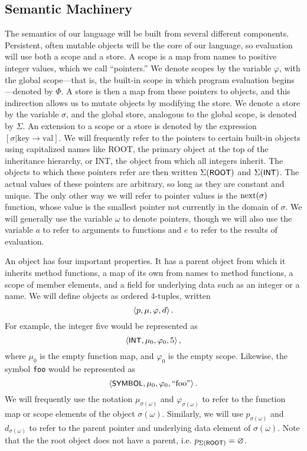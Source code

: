 \documentclass[twocolumn]{article}
\begin{document}
\subsection*{Semantic Machinery}
The semantics of our language will be built from several different
components. Persistent, often mutable objects will be the core of our
language, so evaluation will use both a scope and a store. A scope is
a map from names to positive integer values, which we call
``pointers.'' We denote scopes by the variable $\varphi$, with the
global scope---that is, the built-in scope in which program evaluation
begins---denoted by $\Phi$. A store is then a map from these pointers
to objects, and this indirection allows us to mutate objects by
modifying the store. We denote a store by the variable $\sigma$, and
the global store, analogous to the global scope, is denoted by
$\Sigma$. An extension to a scope or a store is denoted by the
expression $[\sigma|\text{key}\rightarrow\text{val}]$. We will
frequently refer to the pointers to certain built-in objects using
capitalized names like {\ptr ROOT}, the primary object at the top of
the inheritance hierarchy, or {\ptr INT}, the object from which all
integers inherit. The objects to which these pointers refer are then
written $\Sigma(\text{\sf \small ROOT})$ and $\Sigma(\text{\sf \small INT})$. The actual
values of these pointers are arbitrary, so long as they are constant
and unique. The only other way we will refer to pointer values is the
$\operatorname{next}(\sigma)$ function, whose value is the smallest pointer not
currently in the domain of $\sigma$. We will generally use the
variable $\omega$ to denote pointers, though we will also use the
variable $a$ to refer to arguments to functions and $e$ to refer to
the results of evaluation.

An object has four important properties. It has a parent object from
which it inherits method functions, a map of its own from names to
method functions, a scope of member elements, and a field for
underlying data such as an integer or a name. We will define objects
as ordered 4-tuples, written
\[ \left< p, \mu, \varphi, d \right> .\]
For example, the integer five would be represented as
\[ \left< \text{\sf \small INT}, \mu_0, \varphi_0, 5 \right>, \]
where $\mu_0$ is the empty function map, and $\varphi_0$ is the empty
scope. Likewise, the symbol \texttt{foo} would be represented as
\[ \left< \text{\sf \small SYMBOL}, \mu_0, \varphi_0, \text{``foo''} \right>. \] We
will frequently use the notation $\mu_{\sigma(\omega)}$ and
$\varphi_{\sigma(\omega)}$ to refer to the function map or scope
elements of the object $\sigma(\omega)$. Similarly, we will use
$p_{\sigma(\omega)}$ and $d_{\sigma(\omega)}$ to refer to the parent
pointer and underlying data element of $\sigma(\omega)$. Note that the
the root object does not have a parent, i.e.
$p_{\Sigma(\text{\sf ROOT})} = \varnothing$.
\end{document}

